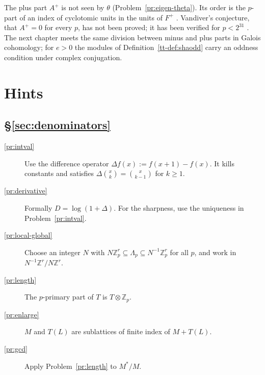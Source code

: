 \documentclass[reqno]{amsart}
\newcounter{chap}
\theoremstyle{definition}
\theoremstyle{plain}
\newcommand{\Z}{\mathbb{Z}}
\begin{document}
The plus part \(A^+\) is not seen by \(\theta\) (Problem~\ref{pr:eigen-theta}).  Its order is the \(p\)-part of an index of cyclotomic units in the units of \(F^+\) \cite[Thm.~8.2]{Wa}.  Vandiver's conjecture, that \(A^+ = 0\) for every \(p\), has not been proved; it has been verified for \(p < 2^{31}\) \cite{HHO}.  The next chapter meets the same division between minus and plus parts in Galois cohomology; for \(e>0\) the modules of Definition~\ref{tt-def:shaodd} carry an oddness condition under complex conjugation.

\section*{Hints}

\subsection*{\S\ref{sec:denominators}}
\begin{description}
\item[\ref{pr:intval}] Use the difference operator \(\Delta f(x):=f(x+1)-f(x)\).  It kills constants and satisfies \(\Delta\binom{x}{k}=\binom{x}{k-1}\) for \(k\ge1\).
\item[\ref{pr:derivative}] Formally \(D = \log(1 + \Delta)\).  For the sharpness, use the uniqueness in Problem~\ref{pr:intval}.
\item[\ref{pr:local-global}] Choose an integer \(N\) with \(N \Z_p^r \subseteq \Lambda_p \subseteq N^{-1}\Z_p^r\) for all \(p\), and work in \(N^{-1}\Z^r / N\Z^r\).
\item[\ref{pr:length}] The \(p\)-primary part of \(T\) is \(T \otimes \Z_p\).
\item[\ref{pr:enlarge}] \(M\) and \(T(L)\) are sublattices of finite index of \(M + T(L)\).
\item[\ref{pr:gcd}] Apply Problem~\ref{pr:length} to \(M^*/M\).
\end{description}
\end{document}
